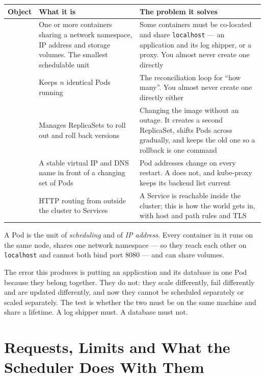\begin{longtable}{@{}L{2.6cm}L{5.4cm}L{6.7cm}@{}}
\toprule
{}
\textbf{Object} & \textbf{What it is} & \textbf{The problem it solves} \\
\midrule
\endhead
{} & One or more containers sharing a network namespace, IP address
and storage volumes. The smallest schedulable unit & Some containers must be
co-located and share \texttt{localhost} --- an application and its log shipper,
or a  proxy. You almost never create one directly \\
 & Keeps $n$ identical Pods running & The reconciliation loop
for ``how many''. You almost never create one directly either \\
 & Manages ReplicaSets to roll out and roll back versions &
Changing the image without an outage. It creates a second ReplicaSet, shifts
Pods across gradually, and keeps the old one so a rollback is one command \\
 & A stable virtual IP and DNS name in front of a changing set of
Pods & Pod addresses change on every restart. A  does not,
and kube-proxy keeps its backend list current \\
 & HTTP routing from outside the cluster to Services & A Service
is reachable inside the cluster; this is how the world gets in, with host and
path rules and TLS \\
\bottomrule
\end{longtable}

\begin{alertbox}
A Pod is the unit of \emph{scheduling} and of \emph{IP address}. Every
container in it runs on the same node, shares one network namespace --- so they
reach each other on \texttt{localhost} and cannot both bind port 8080 --- and
can share volumes.

\smallskip
The error this produces is putting an application and its database in one Pod
because they belong together. They do not: they scale differently, fail
differently and are updated differently, and now they cannot be scheduled
separately or scaled separately. The test is whether the two must be on the
same machine and share a lifetime. A log shipper must. A database must not.
\end{alertbox}

\section{Requests, Limits and What the Scheduler Does With Them}

